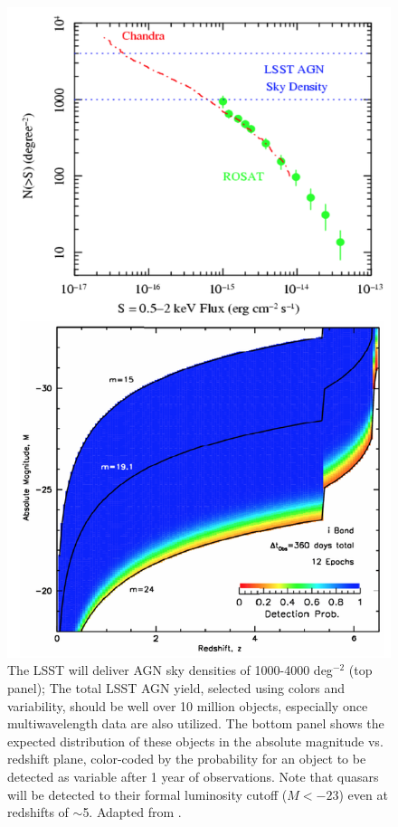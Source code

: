 \begin{figure}
\includegraphics[width=1.0\hsize,clip]{panels3.png}
\caption{The LSST will deliver AGN sky densities of 1000-4000 deg$^{-2}$ (top panel);
The total LSST AGN yield, selected using colors and variability, should be well over
10 million objects, especially once multiwavelength data are also utilized.
The bottom panel shows the expected distribution of these objects in the
absolute magnitude vs. redshift plane, color-coded by the probability for
an object to be
detected as variable after 1 year of observations. Note that quasars will
be detected to their formal luminosity cutoff ($M< -23$) even at redshifts
of $\sim$5. Adapted from \cite{Brandt2007}.}
\label{Fig:panels3}
\end{figure}

